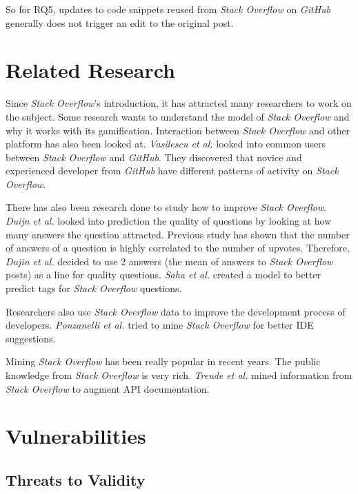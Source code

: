 \documentclass[sigconf]{acmart}
\begin{document}
So for RQ5, updates to code snippets reused from \textit{Stack Overflow} on \textit{GitHub} generally does not trigger an edit to the original post.

\section{Related Research}

Since \textit{Stack Overflow}'s introduction, it has attracted many researchers to work on the subject. Some research wants to understand the model of \textit{Stack Overflow} \cite{Barua2014} and why it works with its gamification. \cite{Cavusoglu:2015:GMV:2685553.2698999} Interaction between \textit{Stack Overflow} and other platform has also been looked at. \textit{Vasilescu et al.} looked into common users between \textit{Stack Overflow} and \textit{GitHub}. They discovered that novice and experienced developer from \textit{GitHub} have different patterns of activity on \textit{Stack Overflow}. \cite{6693332}

There has also been research done to study how to improve \textit{Stack Overflow}. \textit{Duijn et al.} looked into prediction the quality of questions by looking at how many answers the question attracted. \cite{Duijn:2015:QQN:2820518.2820574} Previous study has shown that the number of answers of a question is highly correlated to the number of upvotes. Therefore, \textit{Dujin et al.} decided to use 2 answers (the mean of answers to \textit{Stack Overflow} posts) as a line for quality questions. \textit{Saha et al.} created a model to better predict tags for \textit{Stack Overflow} questions. \cite{Saha:2013:DMA:2487085.2487103} 

Researchers also use \textit{Stack Overflow} data to improve the development process of developers. \textit{Ponzanelli et al.} tried to mine \textit{Stack Overflow} for better IDE suggestions. \cite{Ponzanelli:2014:MST:2597073.2597077}

Mining \textit{Stack Overflow} has been really popular in recent years. The public knowledge from \textit{Stack Overflow} is very rich. \textit{Treude et al.} mined information from \textit{Stack Overflow} to augment API documentation. \cite{7886920} 

\section{Vulnerabilities}

\subsection{Threats to Validity}
\end{document}

